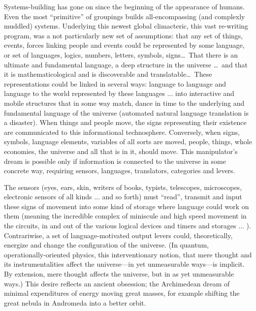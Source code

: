 Systems-building has gone on since the beginning of the appearance of humans. Even the most \enquote{primitive} of groupings builds all-encompassing (and complexly muddled) systems. Underlying this newest global climacteric, this vast re-writing program, was a not particularly new set of assumptions: that any set of things, events, forces linking people and events could be represented by some language, or set of languages, logics, numbers, letters, symbols, signs\ldots\ That there is an ultimate and fundamental language, a deep structure in the universe \ldots\ and that it is mathematicological and is discoverable and translatable\ldots\ These representations could be linked in several ways: language to language and language to the world represented by these languages ... into interactive and mobile structures that in some way match, dance in time to the underlying and fundamental language of the universe (automated natural language translation is a disaster). When things and people move, the signs representing their existence are communicated to this informational technosphere. Conversely, when signs, symbols, language elements, variables of all sorts are moved, people, things, whole economies, the universe and all that is in it, should move. This manipulator's dream is possible only if information is connected to the universe in some concrete way, requiring sensors, languages, translators, categories and levers.

The sensors (eyes, ears, skin, writers of books, typists, telescopes, microscopes, electronic sensors of all kinds ... and so forth) must \enquote{read}, transmit and input these signs of movement into some kind of storage where language could work on them (meaning the incredible complex of miniscule and high speed movement in the circuits, in and out of the various logical devices and timers and storages ... ). Contrariwise, a set of language-motivated output levers could, theoretically, energize and change the configuration of the universe. (In quantum, operationally-oriented physics, this interventionary notion, that mere thought and its instrumentalities affect the universe---in yet unmeasurable ways---is implicit. By extension, mere thought affects the universe, but in as yet unmeasurable ways.) This desire reflects an ancient obsession; the Archimedean dream of minimal expenditures of energy moving great masses, for example shifting the great nebula in Andromeda into a better orbit.

